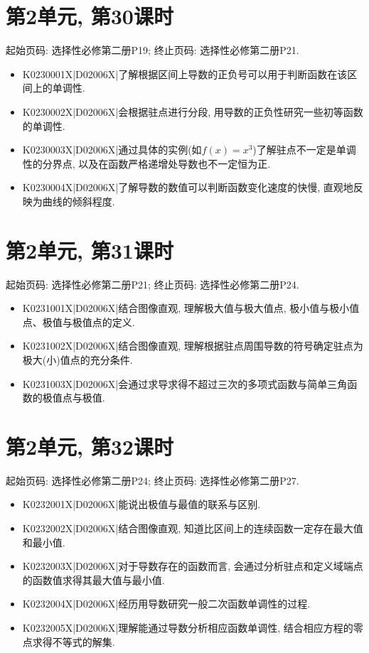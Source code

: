 \section*{第2单元, 第30课时}
起始页码: 选择性必修第二册P19; 终止页码: 选择性必修第二册P21.
\begin{itemize}
\item K0230001X|D02006X|了解根据区间上导数的正负号可以用于判断函数在该区间上的单调性.
\item K0230002X|D02006X|会根据驻点进行分段, 用导数的正负性研究一些初等函数的单调性.
\item K0230003X|D02006X|通过具体的实例(如$f(x)=x^3$)了解驻点不一定是单调性的分界点, 以及在函数严格递增处导数也不一定恒为正.
\item K0230004X|D02006X|了解导数的数值可以判断函数变化速度的快慢, 直观地反映为曲线的倾斜程度.
\end{itemize}

\section*{第2单元, 第31课时}
起始页码: 选择性必修第二册P21; 终止页码: 选择性必修第二册P24.
\begin{itemize}
\item K0231001X|D02006X|结合图像直观, 理解极大值与极大值点, 极小值与极小值点、极值与极值点的定义.
\item K0231002X|D02006X|结合图像直观, 理解根据驻点周围导数的符号确定驻点为极大(小)值点的充分条件.
\item K0231003X|D02006X|会通过求导求得不超过三次的多项式函数与简单三角函数的极值点与极值.
\end{itemize}

\section*{第2单元, 第32课时}
起始页码: 选择性必修第二册P24; 终止页码: 选择性必修第二册P27.
\begin{itemize}
\item K0232001X|D02006X|能说出极值与最值的联系与区别.
\item K0232002X|D02006X|结合图像直观, 知道比区间上的连续函数一定存在最大值和最小值.
\item K0232003X|D02006X|对于导数存在的函数而言, 会通过分析驻点和定义域端点的函数值求得其最大值与最小值.
\item K0232004X|D02006X|经历用导数研究一般二次函数单调性的过程.
\item K0232005X|D02006X|理解能通过导数分析相应函数单调性, 结合相应方程的零点求得不等式的解集.
\end{itemize}

